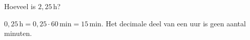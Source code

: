 \documentclass{ximera}
\begin{document}
\begin{question}
    Hoeveel is $2{,}25 \, \mathrm{h}$?

    \begin{multipleChoice}
    \end{multipleChoice}

    \begin{solution}\nl
        $0{,}25 \, \mathrm{h} = 0{,}25 \cdot 60 \, \mathrm{min} = 15 \, \mathrm{min}$. Het decimale deel van een uur is geen aantal minuten.
    \end{solution}
\end{question}
\end{document}
